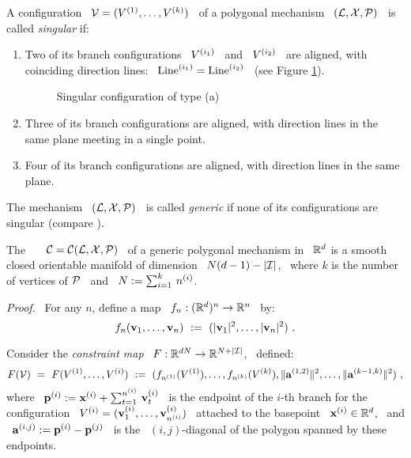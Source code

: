 \begin{defn}\label{dgeneric}
%
A configuration \ $\mathcal{V}=(V\sp{({1})},\dotsc,V\sp{({k})})$ \ of a polygonal
mechanism \ $(\mathcal{L},\mathcal{X},\mathcal{P})$ \ is called \emph{singular} if:
%
\begin{enumerate}
\renewcommand{\labelenumi}{(\alph{enumi})~}
%
\item Two of its branch configurations \ $V\sp{({i_{1}})}$ \ and \
 $V\sp{({i_{2}})}$ \ are aligned, with coinciding direction lines: \
$\operatorname{Line}\sp{({i_{1}})}=\operatorname{Line}\sp{({i_{2}})}$ \ (see Figure \ref{fsingular}).

\begin{figure}[htb]
\begin{center}
\epsfysize=6cm \leavevmode
{} \caption{Singular
configuration of type (a)} \label{fsingular}
\end{center}
\end{figure}

\item Three of its branch configurations are aligned, with direction lines
in the same plane meeting in a single point.
%
\item Four of its branch configurations are aligned, with
  direction lines in the same plane.
%
\end{enumerate}

The mechanism \ $(\mathcal{L},\mathcal{X},\mathcal{P})$ \ is
called \emph{generic} if none of its configurations are singular
(compare \cite{Hau}).
%
\end{defn}

\begin{thm}\label{tone}
%
The \cspace\ \  \ $\mathcal{C}=\mathcal{C}(\mathcal{L},\mathcal{X},\mathcal{P})$ \ of a generic polygonal mechanism
in \ ${\mathbb R}^{d}$ is a smooth closed orientable manifold of dimension \
$N(d-1)-|\mathcal{I}|$, \ where $k$ is the number of vertices of $\mathcal{P}$ \ and \
$N:=\sum_{i=1}^{k}\,{n\sp{({i})}}$.
%
\end{thm}
\newnot{3-1}
\noindent\textit{Proof.} \ For any $n$, define a map \
$f_{n}:({\mathbb R}^{d})^{n}\to{\mathbb R}^{n}$ \ by:
$$
f_{n}(\mathbf{v}_{1},\dotsc,\mathbf{v}_{n})~:=~(|\mathbf{v}_{1}|^{2},\dotsc,|\mathbf{v}_{n}|^{2})~.
$$

Consider the \emph{constraint map} \ $F:{\mathbb R}^{dN}\to{\mathbb R}^{N+|\mathcal{I}|}$, \ defined:
%
\begin{equation}\label{econstr}
%
F(\Vc)~=~F(\Vj{1},\dotsc,\Vj{i})~:=~
(f_{\nj{1}}(\Vj{1}),\dotsc,f_{\nj{k}}(\Vj{k}),
\|\aj{1,2}\|^{2},\dotsc,\|\aj{k-1,k}\|^{2})~,
%
\end{equation}
%
where \ $\mathbf{p}\sp{({i})}:=\mathbf{x}\sp{({i})}+\sum_{t=1}^{n\sp{({i})}}\,\mathbf{v}\sp{({i})}_{t}$ \ is the
endpoint of the $i$-th branch for the configuration \
$V\sp{({i})}=(\mathbf{v}\sp{({i})}_{1},\dotsc,\mathbf{v}\sp{({i})}_{n\sp{({i})}})$ \ attached to the
basepoint \ $\mathbf{x}\sp{({i})}\in{\mathbb R}^{d}$, \ and \ $\mathbf{a}\sp{({i,j})}:=\mathbf{p}\sp{({i})}-\mathbf{p}\sp{({j})}$ \
is the \ $(i,j)$-diagonal of the polygon spanned by these endpoints.

